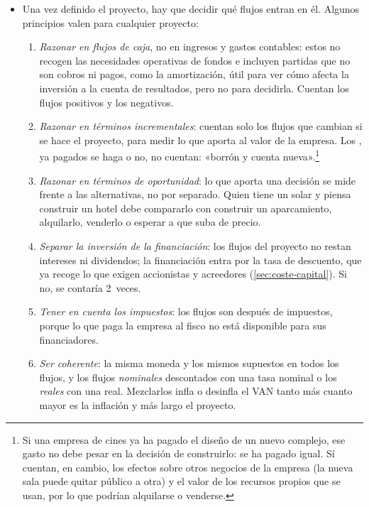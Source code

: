\documentclass[11pt]{article}
\begin{document}
\begin{itemize}
\item Una vez definido el proyecto, hay que decidir qué flujos entran en él. Algunos principios valen para cualquier proyecto\nocite{Vernimmen2017Corporate}:
  \begin{enumerate}
  \item \emph{Razonar en flujos de caja}, no en ingresos y gastos contables: estos no recogen las necesidades operativas de fondos e incluyen partidas que no son cobros ni pagos, como la amortización, útil para ver cómo afecta la inversión a la cuenta de resultados, pero no para decidirla. Cuentan los flujos positivos y los negativos.
  \item \emph{Razonar en términos incrementales}: cuentan solo los flujos que cambian si se hace el proyecto, para medir lo que aporta al valor de la empresa. Los , ya pagados se haga o no, no cuentan: «borrón y cuenta nueva».\footnote{Si una empresa de cines ya ha pagado el diseño de un nuevo complejo, ese gasto no debe pesar en la decisión de construirlo: se ha pagado igual. Sí cuentan, en cambio, los efectos sobre otros negocios de la empresa (la nueva sala puede quitar público a otra) y el valor de los recursos propios que se usan, por lo que podrían alquilarse o venderse\nocite{BrealeyMyersAllen2020Principles}.}
  \item \emph{Razonar en términos de oportunidad}: lo que aporta una decisión se mide frente a las alternativas, no por separado. Quien tiene un solar y piensa construir un hotel debe compararlo con construir un aparcamiento, alquilarlo, venderlo o esperar a que suba de precio.
  \item \emph{Separar la inversión de la financiación}: los flujos del proyecto no restan intereses ni dividendos; la financiación entra por la tasa de descuento, que ya recoge lo que exigen accionistas y acreedores (\ref{sec:coste-capital}). Si no, se contaría 2~veces.
  \item \emph{Tener en cuenta los impuestos}: los flujos son después de impuestos, porque lo que paga la empresa al fisco no está disponible para sus financiadores.
  \item \emph{Ser coherente}: la misma moneda y los mismos supuestos en todos los flujos, y los flujos \emph{nominales} descontados con una tasa nominal o los \emph{reales} con una real. Mezclarlos infla o desinfla el VAN tanto más cuanto mayor es la inflación y más largo el proyecto.
  \end{enumerate}
\end{itemize}
\end{document}
